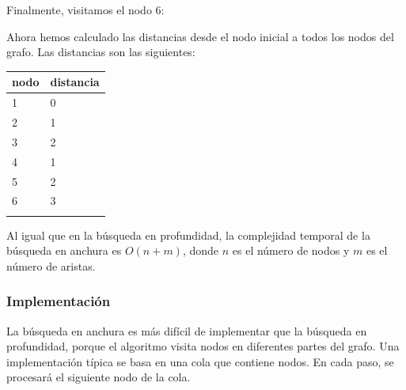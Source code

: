Finalmente, visitamos el nodo 6:
\begin{center}
\end{center}
Ahora hemos calculado las distancias
desde el nodo inicial a todos los nodos del grafo.
Las distancias son las siguientes:

\begin{tabular}{ll}
\\
nodo & distancia \\
\hline
1 & 0 \\
2 & 1 \\
3 & 2 \\
4 & 1 \\
5 & 2 \\
6 & 3 \\
\\
\end{tabular}

Al igual que en la búsqueda en profundidad,
la complejidad temporal de la búsqueda en anchura
es $O(n+m)$, donde $n$ es el número de nodos
y $m$ es el número de aristas.

\subsubsection*{Implementación}

La búsqueda en anchura es más difícil
de implementar que la búsqueda en profundidad,
porque el algoritmo visita nodos
en diferentes partes del grafo.
Una implementación típica se basa en
una cola que contiene nodos.
En cada paso, se procesará el siguiente nodo
de la cola.

